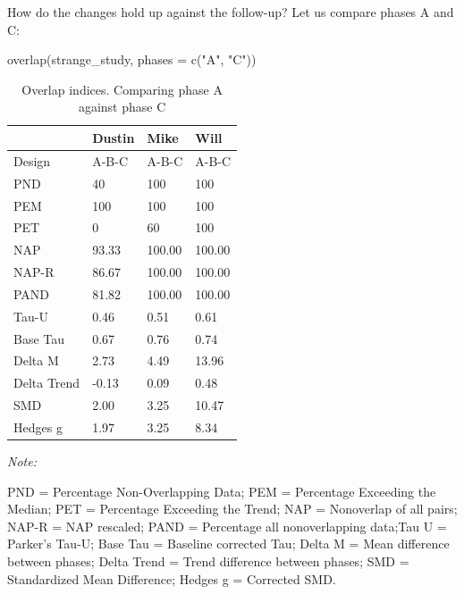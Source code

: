 \documentclass[
]{book}
\newenvironment{Shaded}{\begin{snugshade}}{\end{snugshade}}
\newcommand{\AttributeTok}[1]{\textcolor[rgb]{0.77,0.63,0.00}{#1}}
\newcommand{\FunctionTok}[1]{\textcolor[rgb]{0.00,0.00,0.00}{#1}}
\newcommand{\NormalTok}[1]{#1}
\newcommand{\StringTok}[1]{\textcolor[rgb]{0.31,0.60,0.02}{#1}}
\begin{document}
How do the changes hold up against the follow-up? Let us compare phases A and C:

\begin{Shaded}
\begin{Highlighting}[]
\FunctionTok{overlap}\NormalTok{(strange\_study, }\AttributeTok{phases =} \FunctionTok{c}\NormalTok{(}\StringTok{"A"}\NormalTok{, }\StringTok{"C"}\NormalTok{))}
\end{Highlighting}
\end{Shaded}

\begin{table}[!h]

\caption{\label{tab:overlapAC-strange-study}Overlap indices. Comparing phase A against phase C}
\begin{threeparttable}
\begin{tabular}[t]{llll}
\toprule
  & Dustin & Mike & Will\\
\midrule
Design & A-B-C & A-B-C & A-B-C\\
PND & 40 & 100 & 100\\
PEM & 100 & 100 & 100\\
PET & 0 & 60 & 100\\
NAP & 93.33 & 100.00 & 100.00\\
NAP-R & 86.67 & 100.00 & 100.00\\
PAND & 81.82 & 100.00 & 100.00\\
Tau-U & 0.46 & 0.51 & 0.61\\
Base Tau & 0.67 & 0.76 & 0.74\\
Delta M & 2.73 & 4.49 & 13.96\\
Delta Trend & -0.13 & 0.09 & 0.48\\
SMD & 2.00 & 3.25 & 10.47\\
Hedges g & 1.97 & 3.25 & 8.34\\
\bottomrule
\end{tabular}
\begin{tablenotes}
\item \textit{Note: } 
\item PND = Percentage Non-Overlapping Data; PEM = Percentage Exceeding the Median; PET = Percentage Exceeding the Trend; NAP = Nonoverlap of all pairs; NAP-R = NAP rescaled; PAND = Percentage all nonoverlapping data;Tau U = Parker's Tau-U; Base Tau = Baseline corrected Tau; Delta M = Mean difference between phases; Delta Trend = Trend difference between phases; SMD = Standardized Mean Difference; Hedges g = Corrected SMD.
\end{tablenotes}
\end{threeparttable}
\end{table}
\end{document}
